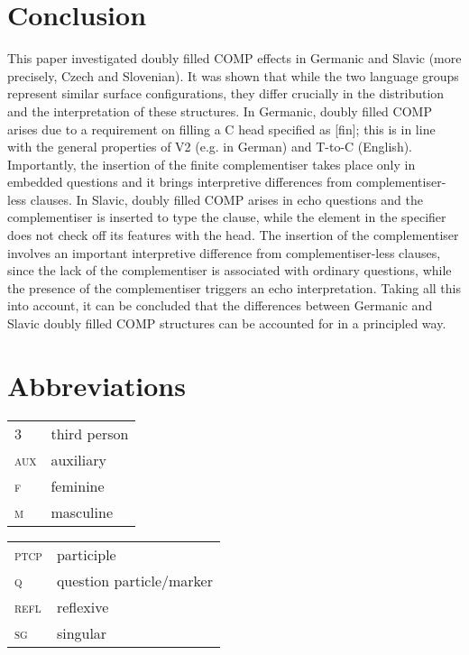 \documentclass[output=paper,
modfonts, hidelinks, newtxmath
]{langscibook}
\begin{document}
\section{Conclusion}
This paper investigated doubly filled COMP effects in Germanic and Slavic (more precisely, Czech and Slovenian). It was shown that while the two language groups represent similar surface configurations, they differ crucially in the distribution and the interpretation of these structures. In Germanic, doubly filled COMP arises due to a requirement on filling a C head specified as [fin]; this is in line with the general properties of V2 (e.g. in German) and T-to-C (English). Importantly, the insertion of the finite complementiser takes place only in embedded questions and it brings interpretive differences from complementiser-less clauses. In Slavic, doubly filled COMP arises in echo questions and the complementiser is inserted to type the clause, while the element in the specifier does not check off its features with the head. The insertion of the complementiser involves an important interpretive difference from complementiser-less clauses, since the lack of the complementiser is associated with ordinary questions, while the presence of the complementiser triggers an echo interpretation. Taking all this into account, it can be concluded that the differences between Germanic and Slavic doubly filled COMP structures can be accounted for in a principled way.




\section*{Abbreviations}

\begin{tabularx}{.45\textwidth}{lX}
3&third person\\
\textsc{aux}&auxiliary\\
\textsc{f}&feminine\\
\textsc{m}&masculine\\
\end{tabularx}
\begin{tabularx}{.45\textwidth}{lX}
\textsc{ptcp}&participle\\
\textsc{q}&question particle/marker\\
\textsc{refl}&reflexive\\
\textsc{sg}&singular\\
\end{tabularx}
\end{document}
